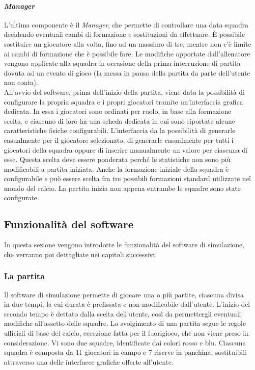 \paragraph{\textit{Manager}} \label{sec:struttura_manager} L'ultima componente è il \textit{Manager}, che permette di controllare una data squadra decidendo eventuali cambi di formazione e sostituzioni da effettuare. È possibile sostituire un giocatore alla volta, fino ad un massimo di tre, mentre non c'è limite ai cambi di formazione che è possibile fare. Le modifiche apportate dall'allenatore vengono applicate alla squadra in occasione della prima interruzione di partita dovuta ad un evento di gioco (la messa in pausa della partita da parte dell'utente non conta).\\

All'avvio del software, prima dell'inizio della partita, viene data la possibilità di configurare la propria squadra e i propri giocatori tramite un'interfaccia grafica dedicata. In essa i giocatori sono ordinati per ruolo, in base alla formazione scelta, e ciascuno di loro ha una scheda dedicata in cui sono riportate alcune caratteristiche fisiche configurabili. L'interfaccia da la possibilità di generarle casualmente per il giocatore selezionato, di generarle casualmente per tutti i giocatori della squadra oppure di inserire manualmente un valore per ciascuna di esse. Questa scelta deve essere ponderata perché le statistiche non sono più modificabili a partita iniziata. Anche la formazione iniziale della squadra è configurabile e può essere scelta fra tre possibili formazioni standard utilizzate nel mondo del calcio. La partita inizia non appena entrambe le squadre sono state configurate.

\subsection{Funzionalità del software}
\label{sec:funzionalita_del_software}

In questa sezione vengono introdotte le funzionalità del software di simulazione, che verranno poi dettagliate nei capitoli successivi.

\subsubsection{La partita}
\label{sec:analisi_partita}

Il software di simulazione permette di giocare una o più partite, ciascuna divisa in due tempi, la cui durata è prefissata e non modificabile dall'utente. L'inizio del secondo tempo è dettato dalla scelta dell'utente, così da permettergli eventuali modifiche all'assetto delle squadre. Lo svolgimento di una partita segue le regole ufficiali di base del calcio, eccezione fatta per il fuorigioco, che non viene preso in considerazione. Vi sono due squadre, identificate dai colori rosso e blu. Ciascuna squadra è composta da 11 giocatori in campo e 7 riserve in panchina, sostituibili attraverso una delle interfacce grafiche offerte all'utente.\\

